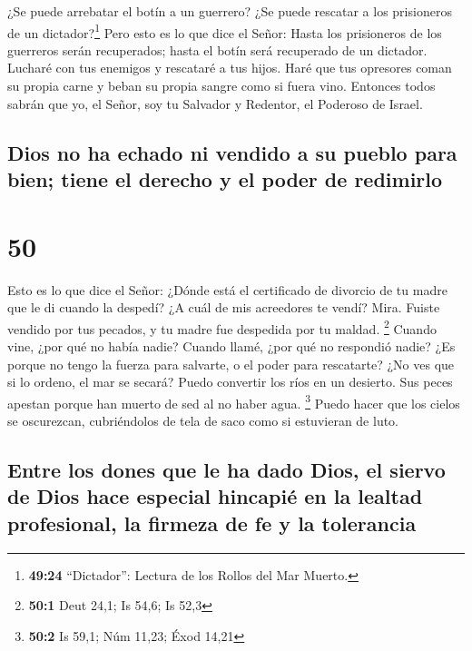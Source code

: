  ¿Se puede arrebatar el botín a un guerrero? ¿Se puede
rescatar a los prisioneros de un dictador?\footnote{\textbf{49:24}
  ``Dictador'': Lectura de los Rollos del Mar Muerto.} 
Pero esto es lo que dice el Señor: Hasta los prisioneros de los
guerreros serán recuperados; hasta el botín será recuperado de un
dictador. Lucharé con tus enemigos y rescataré a tus hijos.
 Haré que tus opresores coman su propia carne y beban su
propia sangre como si fuera vino. Entonces todos sabrán que yo, el
Señor, soy tu Salvador y Redentor, el Poderoso de Israel.

\hypertarget{dios-no-ha-echado-ni-vendido-a-su-pueblo-para-bien-tiene-el-derecho-y-el-poder-de-redimirlo}{%
\subsection{Dios no ha echado ni vendido a su pueblo para bien; tiene el
derecho y el poder de
redimirlo}\label{dios-no-ha-echado-ni-vendido-a-su-pueblo-para-bien-tiene-el-derecho-y-el-poder-de-redimirlo}}

\hypertarget{section-49}{%
\section{50}\label{section-49}}

 Esto es lo que dice el Señor: ¿Dónde está el certificado
de divorcio de tu madre que le di cuando la despedí? ¿A cuál de mis
acreedores te vendí? Mira. Fuiste vendido por tus pecados, y tu madre
fue despedida por tu maldad. \footnote{\textbf{50:1} Deut 24,1; Is 54,6;
  Is 52,3}  Cuando vine, ¿por qué no había nadie? Cuando
llamé, ¿por qué no respondió nadie? ¿Es porque no tengo la fuerza para
salvarte, o el poder para rescatarte? ¿No ves que si lo ordeno, el mar
se secará? Puedo convertir los ríos en un desierto. Sus peces apestan
porque han muerto de sed al no haber agua. \footnote{\textbf{50:2} Is
  59,1; Núm 11,23; Éxod 14,21}  Puedo hacer que los cielos
se oscurezcan, cubriéndolos de tela de saco como si estuvieran de luto.

\hypertarget{entre-los-dones-que-le-ha-dado-dios-el-siervo-de-dios-hace-especial-hincapiuxe9-en-la-lealtad-profesional-la-firmeza-de-fe-y-la-tolerancia}{%
\subsection{Entre los dones que le ha dado Dios, el siervo de Dios hace
especial hincapié en la lealtad profesional, la firmeza de fe y la
tolerancia}\label{entre-los-dones-que-le-ha-dado-dios-el-siervo-de-dios-hace-especial-hincapiuxe9-en-la-lealtad-profesional-la-firmeza-de-fe-y-la-tolerancia}}

